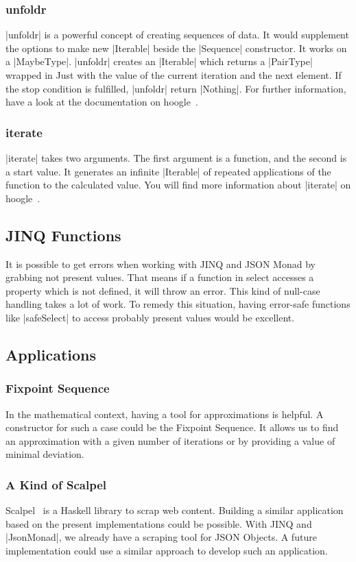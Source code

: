 \subsubsection{unfoldr}
\label{subsub:unfoldr}
|unfoldr| is a powerful concept of creating sequences of data. It would
supplement the options to make new |Iterable| beside the |Sequence|
constructor. It works on a |MaybeType|. |unfoldr| creates an |Iterable| which returns
a |PairType| wrapped in Just with the value of the current iteration and the next
element. If the stop condition is fulfilled, |unfoldr| return |Nothing|. For
further information, have a look at the documentation on hoogle~\cite{hoogle_unfoldr}.

\subsubsection{iterate}
\label{subsub:iterate}
|iterate| takes two arguments. The first argument is a function, and the second
is a start value. It generates an infinite |Iterable| of repeated applications of
the function to the calculated value. You will find more information about
|iterate| on hoogle~\cite{hoogle_iterate}.

\subsection{JINQ Functions}
\label{sub:JINQ Functions}
It is possible to get errors when working with JINQ and JSON Monad by grabbing
not present values. That means if a function in select accesses a property
which is not defined, it will throw an error. This kind of null-case handling
takes a lot of work. To remedy this situation, having error-safe functions like
|safeSelect| to access probably present values would be excellent.

\subsection{Applications}
\label{sub:Applications}
\subsubsection{Fixpoint Sequence}
\label{subsub:Fixpoint Sequence}
In the mathematical context, having a tool for approximations is helpful. A
constructor for such a case could be the Fixpoint Sequence. It allows us to
find an approximation with a given number of iterations or by providing a value
of minimal deviation.

\subsubsection{A Kind of Scalpel}
\label{subsub:A Kind of Scalpel}
Scalpel~\cite{scalpel} is a Haskell library to scrap web content. Building a similar
application based on the present implementations could be possible. With JINQ
and |JsonMonad|, we already have a scraping tool for JSON Objects. A future
implementation could use a similar approach to develop such an application.

